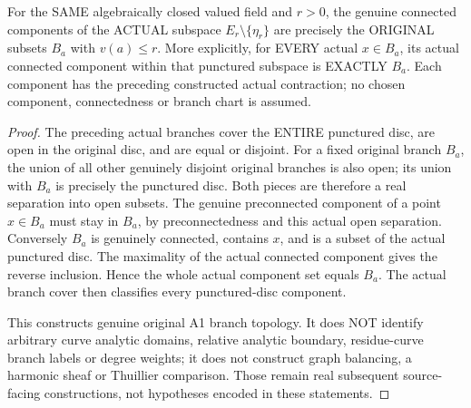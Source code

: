 \begin{theorem}
\label{analytic:actual-gauss-punctured-disc-components}
\leanok
{}
For the SAME algebraically closed valued field and $r>0$, the genuine
connected components of the ACTUAL subspace $E_r\setminus\{\eta_r\}$
are precisely the ORIGINAL subsets $B_a$ with $v(a)\le r$. More explicitly,
for EVERY actual $x\in B_a$, its actual connected component within that
punctured subspace is EXACTLY $B_a$. Each component has the preceding
constructed actual contraction; no chosen component, connectedness or
branch chart is assumed.
\end{theorem}
\begin{proof}
The preceding actual branches cover the ENTIRE punctured disc, are open in
the original disc, and are equal or disjoint. For a fixed original branch
$B_a$, the union of all other genuinely disjoint original branches is also
open; its union with $B_a$ is precisely the punctured disc. Both pieces are
therefore a real separation into open subsets. The genuine preconnected
component of a point $x\in B_a$ must stay in $B_a$, by preconnectedness
and this actual open separation. Conversely $B_a$ is genuinely connected,
contains $x$, and is a subset of the actual punctured disc. The maximality
of the actual connected component gives the reverse inclusion. Hence the
whole actual component set equals $B_a$. The actual branch cover then
classifies every punctured-disc component.

This constructs genuine original A1 branch topology. It does NOT identify
arbitrary curve analytic domains, relative analytic boundary, residue-curve
branch labels or degree weights; it does not construct graph balancing,
a harmonic sheaf or Thuillier comparison. Those remain real subsequent
source-facing constructions, not hypotheses encoded in these statements.
\end{proof}
